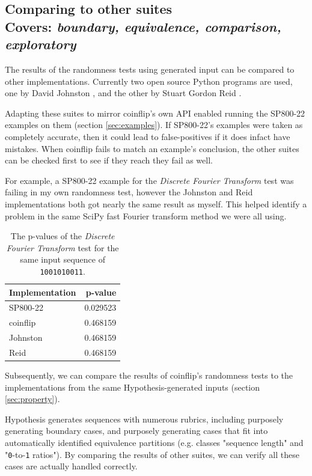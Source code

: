\documentclass[11pt]{article}
\begin{document}
\subsection[Comparing to other suites]{Comparing to other suites\\ \small{Covers: \emph{boundary, equivalence, comparison, exploratory}}}
\label{sec:compare}

The results of the randomness tests using generated input can be compared to other implementations. Currently two open source Python programs are used, one by David Johnston \cite{dj}, and the other by Stuart Gordon Reid \cite{sgr}. 

Adapting these suites to mirror coinflip's own API enabled running the SP800-22 examples on them (section \ref{sec:examples}). If SP800-22's examples were taken as completely accurate, then it could lead to false-positives if it does infact have mistakes. When coinflip fails to match an example's conclusion, the other suites can be checked first to see if they reach they fail as well.

For example, a SP800-22 example for the \emph{Discrete Fourier Transform} test was failing in my own randomness test, however the Johnston and Reid implementations both got nearly the same result as myself. This helped identify a problem in the same SciPy \cite{scipy} fast Fourier transform method we were all using.

\begin{table}[htbp]
  \caption[p-values of \emph{Discrete Fourier Transform} implementations]{The p-values of the \emph{Discrete Fourier Transform} test for the same input sequence of \texttt{1001010011}.}
  \centering
  \begin{tabular}{lr}
    Implementation & p-value\\
    \hline
    SP800-22 & 0.029523\\
    coinflip & 0.468159\\
    Johnston & 0.468159\\
    Reid & 0.468159\\
  \end{tabular}
\end{table}

\FloatBarrier

Subsequently, we can compare the results of coinflip's randomness tests to the implementations from the same Hypothesis-generated inputs (section \ref{sec:property}).

Hypothesis generates sequences with numerous rubrics, including purposely generating boundary cases, and purposely generating cases that fit into automatically identified equivalence partitions (e.g. classes "sequence length" and "\texttt{0}-to-\texttt{1} ratios"). By comparing the results of other suites, we can verify all these cases are actually handled correctly.
\end{document}
